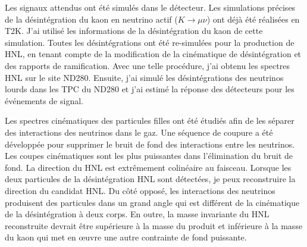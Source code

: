 \documentclass[../main.tex]{subfiles}
\begin{document}
Les signaux attendus ont été simulés dans le détecteur. Les simulations précises de la désintégration du kaon en neutrino actif ($K\to\mu\nu$) ont déjà été réalisées en T2K. J'ai utilisé les informations de la désintégration du kaon de cette simulation. Toutes les désintégrations ont été re-simulées pour la production de HNL, en tenant compte de la modification de la cinématique de désintégration et des rapports de ramification. Avec une telle procédure, j'ai obtenu les spectres HNL sur le site ND280. Ensuite, j'ai simulé les désintégrations des neutrinos lourds dans les TPC du ND280 et j'ai estimé la réponse des détecteurs pour les événements de signal.


Les spectres cinématiques des particules filles ont été étudiés afin de les séparer des interactions des neutrinos dans le gaz. Une séquence de coupure a été développée pour supprimer le bruit de fond des interactions entre les neutrinos. Les coupes cinématiques sont les plus puissantes dans l'élimination du bruit de fond. La direction du HNL est extrêmement colinéaire au faisceau. Lorsque les deux particules de la désintégration HNL sont détectées, je peux reconstruire la direction du candidat HNL. Du côté opposé, les interactions des neutrinos produisent des particules dans un grand angle qui est différent de la cinématique de la désintégration à deux corps. En outre, la masse invariante du HNL reconstruite devrait être supérieure à la masse du produit et inférieure à la masse du kaon qui met en œuvre une autre contrainte de fond puissante.


\end{document}
